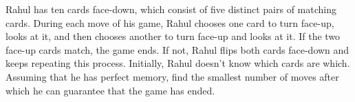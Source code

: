 Rahul has ten cards face-down, which consist of five distinct pairs of matching cards. During each move of his game, Rahul chooses one card to turn face-up, looks at it, and then chooses another to turn face-up and looks at it. If the two face-up cards match, the game ends. If not, Rahul flips both cards face-down and keeps repeating this process. Initially, Rahul doesn't know which cards are which. Assuming that he has perfect memory, find the smallest number of moves after which he can guarantee that the game has ended.